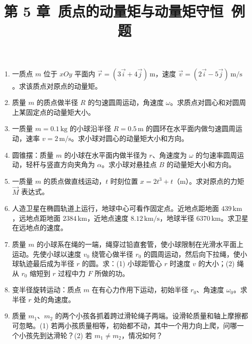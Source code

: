 \documentclass[12pt]{article}
\title{第 5 章\ 质点的动量矩与动量矩守恒\ 例题}
\author{}
\date{}
\begin{document}
\maketitle

\begin{enumerate}[label=\textbf{例\arabic*.}, leftmargin=*]

\item 一质点 $m$ 位于 $xOy$ 平面内 $\vec{r} = (3\vec{i} + 4\vec{j})\,\mathrm{m}$，速度 $\vec{v} = (2\vec{i} - 5\vec{j})\,\mathrm{m/s}$。求该质点对原点的动量矩。

\item 质量 $m$ 的质点做半径 $R$ 的匀速圆周运动，角速度 $\omega$。求质点对圆心和对圆周上某固定点的动量矩大小。

\item 一质量 $m = 0.1\,\mathrm{kg}$ 的小球沿半径 $R = 0.5\,\mathrm{m}$ 的圆环在水平面内做匀速圆周运动，速率 $v = 2\,\mathrm{m/s}$。求小球对圆心的动量矩大小和方向。

\item 圆锥摆：质量 $m$ 的小球在水平面内做半径为 $r$、角速度为 $\omega$ 的匀速率圆周运动，轻杆与竖直方向夹角为 $\alpha$。求小球对悬挂点 $B$ 的动量矩大小和方向。

\item 一质量 $m$ 的质点做直线运动，$t$ 时刻位置 $x = 2t^3 + t$（m）。求对原点的力矩 $\vec{M}$ 表达式。

\item 人造卫星在椭圆轨道上运行，地球中心可看作固定点。近地点距地面 $439\,\mathrm{km}$，远地点距地面 $2384\,\mathrm{km}$，近地点速度 $8.12\,\mathrm{km/s}$，地球半径 $6370\,\mathrm{km}$。求卫星在远地点的速度。

\item 质量 $m$ 的小球系在绳的一端，绳穿过铅直套管，使小球限制在光滑水平面上运动。先使小球以速度 $v_0$ 绕管心做半径 $r_0$ 的圆周运动，然后向下拉绳，使小球轨迹最后成为半径 $r$ 的圆。求：(1) 小球距管心 $r$ 时速度 $v$ 的大小；(2) 绳从 $r_0$ 缩短到 $r$ 过程中力 $F$ 所做的功。

\item 变半径旋转运动：质点 $m$ 在有心力作用下运动，初始半径 $r_0$、角速度 $\omega_0$。求半径 $r$ 处的角速度。

\item 质量 $m_1$、$m_2$ 的两个小孩各抓着跨过滑轮绳子两端。设滑轮质量和轴上摩擦都可忽略。(1) 若两小孩质量相等，初始都不动，其中一个用力向上爬，问哪一个小孩先到达滑轮？(2) 若 $m_1 \ne m_2$，情况如何？


\end{enumerate}
\end{document}
